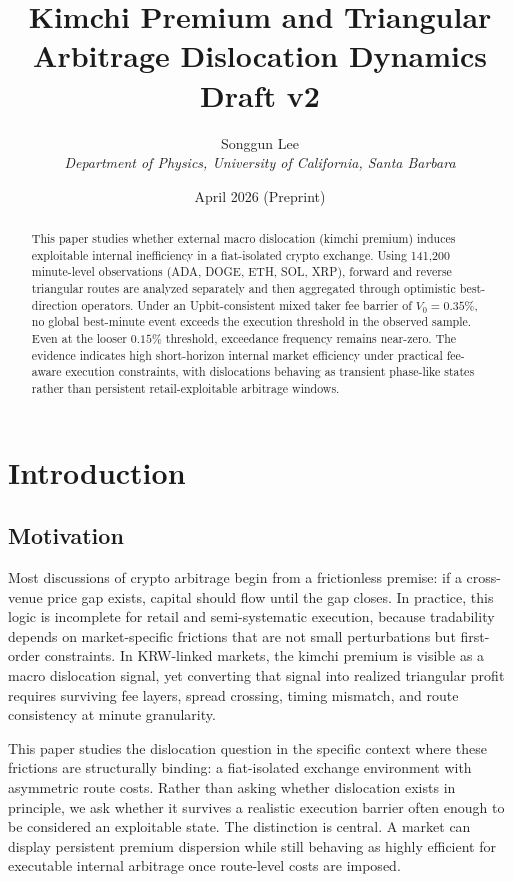 \documentclass[11pt,a4paper]{article}
\title{\textbf{Kimchi Premium and Triangular Arbitrage Dislocation Dynamics}\\Draft v2}
\author{Songgun Lee \\ \textit{Department of Physics, University of California, Santa Barbara}}
\date{April 2026 (Preprint)}
\begin{document}
\maketitle

\begin{abstract}
This paper studies whether external macro dislocation (kimchi premium) induces exploitable internal inefficiency in a fiat-isolated crypto exchange. Using 141,200 minute-level observations (ADA, DOGE, ETH, SOL, XRP), forward and reverse triangular routes are analyzed separately and then aggregated through optimistic best-direction operators. Under an Upbit-consistent mixed taker fee barrier of $V_0=0.35\%$, no global best-minute event exceeds the execution threshold in the observed sample. Even at the looser $0.15\%$ threshold, exceedance frequency remains near-zero. The evidence indicates high short-horizon internal market efficiency under practical fee-aware execution constraints, with dislocations behaving as transient phase-like states rather than persistent retail-exploitable arbitrage windows.
\end{abstract}

\tableofcontents
\newpage

\section{Introduction}
\subsection{Motivation}
Most discussions of crypto arbitrage begin from a frictionless premise: if a cross-venue price gap exists, capital should flow until the gap closes. In practice, this logic is incomplete for retail and semi-systematic execution, because tradability depends on market-specific frictions that are not small perturbations but first-order constraints. In KRW-linked markets, the kimchi premium is visible as a macro dislocation signal, yet converting that signal into realized triangular profit requires surviving fee layers, spread crossing, timing mismatch, and route consistency at minute granularity.

This paper studies the dislocation question in the specific context where these frictions are structurally binding: a fiat-isolated exchange environment with asymmetric route costs. Rather than asking whether dislocation exists in principle, we ask whether it survives a realistic execution barrier often enough to be considered an exploitable state. The distinction is central. A market can display persistent premium dispersion while still behaving as highly efficient for executable internal arbitrage once route-level costs are imposed.
\end{document}
